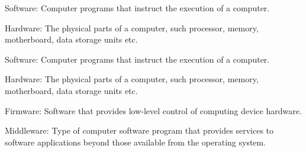 \documentclass[a4paper, 11pt]{article}
\begin{document}
\bigskip

\begin{PLTEnumerate}
    \item Software: Computer programs that instruct the execution of a computer.
    \item Hardware: The physical parts of a computer, such processor, memory, motherboard, data storage units etc.
    \begin{PLTEnumerate}
        \item Software: Computer programs that instruct the execution of a computer.
        \item Hardware: The physical parts of a computer, such processor, memory, motherboard, data storage units etc.
    \end{PLTEnumerate}
    \item Firmware: Software that provides low-level control of computing device hardware.
    \item Middleware: Type of computer software program that provides services to software applications beyond those available from the operating system.
\end{PLTEnumerate}
\end{document}
